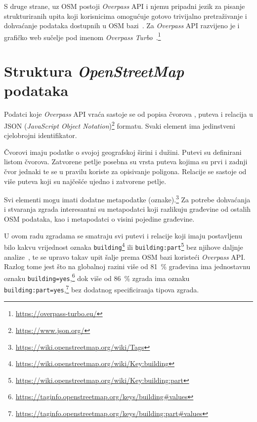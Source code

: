 \documentclass[times, utf8, zavrsni, numeric]{fer}
\begin{document}
		S druge strane, uz OSM postoji \textit{Overpass} API i njemu pripadni jezik za pisanje strukturiranih upita  koji korisnicima omogućuje gotovo trivijalno pretraživanje i dohvaćanje podataka dostupnih u OSM bazi~\cite{wiki:overpassapi}\cite{wiki:overpassql}.
		Za \textit{Overpass} API razvijeno je i grafičko web sučelje pod imenom \textit{Overpass Turbo}~\cite{wiki:overpassturbo}.\footnote{\url{https://overpass-turbo.eu/}}
	
	
	
	\section{Struktura \textit{OpenStreetMap} podataka}
	
		Podatci koje \textit{Overpass} API vraća sastoje se od popisa čvorova , puteva  i relacija  u JSON (\textit{JavaScript Object Notation})\footnote{\url{https://www.json.org/}} formatu.
		Svaki element ima jedinstveni cjelobrojni identifikator.
		
		Čvorovi imaju podatke o svojoj geografskoj širini i dužini.
		Putevi su definirani listom čvorova.
		Zatvorene petlje posebna su vrsta puteva kojima su prvi i zadnji čvor jednaki te se u pravilu koriste za opisivanje poligona.
		Relacije se sastoje od više puteva koji su najčešće ujedno i zatvorene petlje.
		
		Svi elementi mogu imati dodatne metapodatke (oznake).\footnote{\url{https://wiki.openstreetmap.org/wiki/Tags}}
		Za potrebe dohvaćanja i stvaranja zgrada interesantni su metapodatci koji razlikuju građevine od ostalih OSM podataka, kao i metapodatci o visini pojedine građevine.
		
		U ovom radu zgradama se smatraju svi putevi i relacije koji imaju postavljenu bilo kakvu vrijednost oznaka \texttt{building}\footnote{\url{https://wiki.openstreetmap.org/wiki/Key:building}} ili \texttt{building:part}\footnote{\url{https://wiki.openstreetmap.org/wiki/Key:building:part}} bez njihove daljnje analize~\cite{wiki:simple3d}, te se upravo takav upit šalje prema OSM bazi koristeći \textit{Overpass} API.
		Razlog tome jest što na globalnoj razini više od \SI{81}{\percent} građevina ima jednostavnu oznaku \texttt{building=yes},\footnote{\url{https://taginfo.openstreetmap.org/keys/building#values}} dok više od \SI{86}{\percent} zgrada ima oznaku \texttt{building:part=yes},\footnote{\url{https://taginfo.openstreetmap.org/keys/building:part#values}} bez dodatnog specificiranja tipova zgrada.
		
\end{document}
